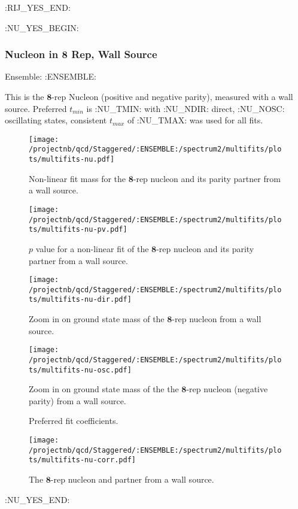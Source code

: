 \clearpage
:RIJ_YES_END:

:NU_YES_BEGIN:
\subsubsection{Nucleon in $\mathbf{8}$ Rep, Wall Source}

Ensemble: :ENSEMBLE:

This is the $\mathbf{8}$-rep Nucleon (positive and negative parity), measured with a wall source. Preferred $t_{min}$ is :NU_TMIN: with :NU_NDIR: direct, :NU_NOSC: oscillating states, consistent $t_{max}$ of :NU_TMAX: was used for all fits.

\begin{multicols}{2}
\begin{figure}[H]
\centering
\texttt{[image: /projectnb/qcd/Staggered/:ENSEMBLE:/spectrum2/multifits/plots/multifits-nu.pdf]}
\caption{Non-linear fit mass for the $\mathbf{8}$-rep nucleon and its parity partner from a wall source.}
\end{figure}
\columnbreak
\begin{figure}[H]
\centering
\texttt{[image: /projectnb/qcd/Staggered/:ENSEMBLE:/spectrum2/multifits/plots/multifits-nu-pv.pdf]}
\caption{$p$ value for a non-linear fit of the $\mathbf{8}$-rep nucleon and its parity partner from a wall source.}
\end{figure}
\end{multicols}

\begin{multicols}{2}
\begin{figure}[H]
\centering
\texttt{[image: /projectnb/qcd/Staggered/:ENSEMBLE:/spectrum2/multifits/plots/multifits-nu-dir.pdf]}
\caption{Zoom in on ground state mass of the $\mathbf{8}$-rep nucleon from a wall source.}
\end{figure}
\columnbreak
\begin{figure}[H]
\centering
\texttt{[image: /projectnb/qcd/Staggered/:ENSEMBLE:/spectrum2/multifits/plots/multifits-nu-osc.pdf]}
\caption{Zoom in on ground state mass of the the $\mathbf{8}$-rep nucleon (negative parity) from a wall source.}
\end{figure}
\end{multicols}

\begin{multicols}{2}
\begin{figure}[H]
\centering
\scriptsize

\caption{Preferred fit coefficients.}
\end{figure}
\columnbreak
\begin{figure}[H]
\centering
\texttt{[image: /projectnb/qcd/Staggered/:ENSEMBLE:/spectrum2/multifits/plots/multifits-nu-corr.pdf]}
\caption{The $\mathbf{8}$-rep nucleon and partner from a wall source.}
\end{figure}
\end{multicols}

\clearpage
:NU_YES_END:

